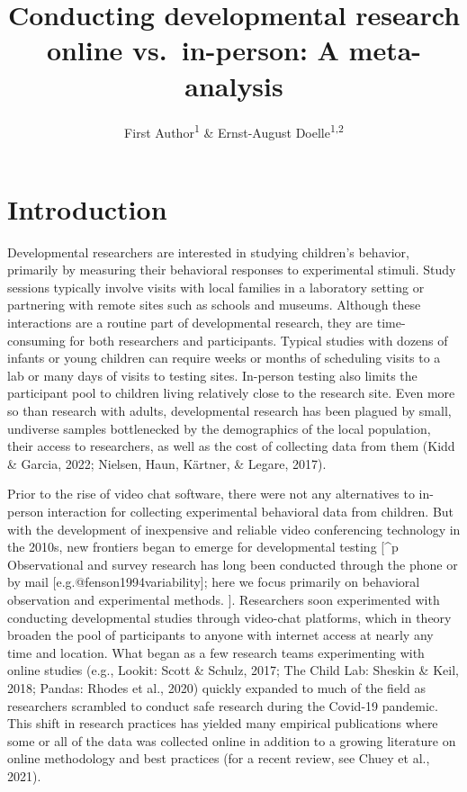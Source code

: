 \documentclass[
  man,floatsintext]{apa6}
\title{Conducting developmental research online vs.~in-person: A meta-analysis}
\author{First Author\textsuperscript{1} \& Ernst-August Doelle\textsuperscript{1,2}}
\date{}
\affiliation{\vspace{0.5cm}\textsuperscript{1} Wilhelm-Wundt-University\\\textsuperscript{2} Konstanz Business School}
\begin{document}
\maketitle

\hypertarget{introduction}{%
\section{Introduction}\label{introduction}}

Developmental researchers are interested in studying children's behavior, primarily by measuring their behavioral responses to experimental stimuli. Study sessions typically involve visits with local families in a laboratory setting or partnering with remote sites such as schools and museums. Although these interactions are a routine part of developmental research, they are time-consuming for both researchers and participants. Typical studies with dozens of infants or young children can require weeks or months of scheduling visits to a lab or many days of visits to testing sites. In-person testing also limits the participant pool to children living relatively close to the research site. Even more so than research with adults, developmental research has been plagued by small, undiverse samples bottlenecked by the demographics of the local population, their access to researchers, as well as the cost of collecting data from them (Kidd \& Garcia, 2022; Nielsen, Haun, Kärtner, \& Legare, 2017).

Prior to the rise of video chat software, there were not any alternatives to in-person interaction for collecting experimental behavioral data from children. But with the development of inexpensive and reliable video conferencing technology in the 2010s, new frontiers began to emerge for developmental testing {[}\^{}p Observational and survey research has long been conducted through the phone or by mail {[}e.g.@fenson1994variability{]}; here we focus primarily on behavioral observation and experimental methods.
{]}. Researchers soon experimented with conducting developmental studies through video-chat platforms, which in theory broaden the pool of participants to anyone with internet access at nearly any time and location. What began as a few research teams experimenting with online studies (e.g., Lookit: Scott \& Schulz, 2017; The Child Lab: Sheskin \& Keil, 2018; Pandas: Rhodes et al., 2020) quickly expanded to much of the field as researchers scrambled to conduct safe research during the Covid-19 pandemic. This shift in research practices has yielded many empirical publications where some or all of the data was collected online in addition to a growing literature on online methodology and best practices (for a recent review, see Chuey et al., 2021).
\end{document}
